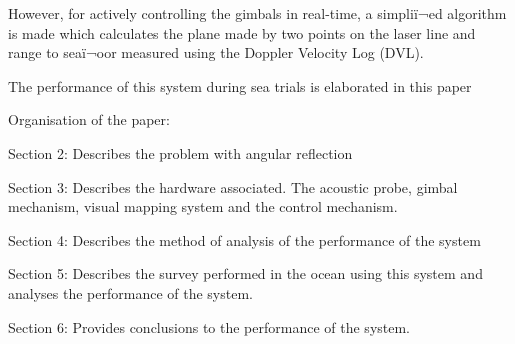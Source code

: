 However, for actively controlling the gimbals in real-time, a simpliï¬ed algorithm is made which calculates the plane made by two points on the laser line and range to seaï¬oor measured using the Doppler Velocity Log (DVL). 

The performance of this system during sea trials is elaborated in this paper


Organisation of the paper:

Section 2: Describes the problem with angular reflection 

Section 3: Describes the hardware associated. The acoustic probe, gimbal mechanism, visual mapping system and the control mechanism.

Section 4: Describes the method of analysis of the performance of the system

Section 5: Describes the survey performed in the ocean using this system and analyses the performance of the system.

Section 6: Provides conclusions to the performance of the system.